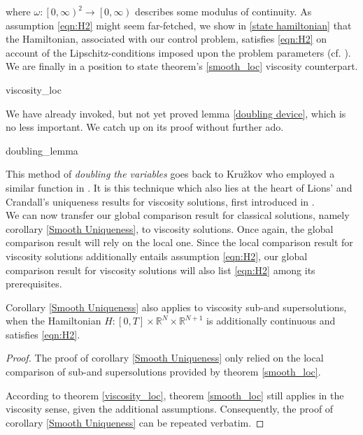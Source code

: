 		 where $ \omega : \left[0, \infty \right)^2 \to \left[0, \infty \right) $ describes some modulus of continuity. As assumption \eqref{eqn:H2} 
		 might seem far-fetched, we show in \ref{state hamiltonian} that the Hamiltonian, associated with our control problem, satisfies \eqref{eqn:H2} on account of the Lipschitz-conditions imposed upon the problem parameters (cf. \cite[p.~167]{zhou}). We are finally in a position to state theorem's \ref{smooth_loc} viscosity counterpart.
		 
		 {viscosity_loc}
		 
		 We have already invoked, but not yet proved lemma \ref{doubling device}, which is no less important. We catch up on its proof without further ado.
		 
		 {doubling_lemma}
		 
		 This method of \emph{doubling the variables} goes back to Kru\v{z}kov who employed a similar function in \cite{kruvzkov}. It is this technique which also lies at the heart of Lions' and Crandall's uniqueness results for viscosity solutions, first introduced in \cite{lions}. \\
		 
		 We can now transfer our global comparison result for classical solutions, namely corollary \ref{Smooth Uniqueness}, to viscosity solutions. Once again, the global comparison result will rely on the local one. Since the local comparison result for viscosity solutions additionally entails assumption  \eqref{eqn:H2}, our global comparison result for viscosity solutions will also list \eqref{eqn:H2} among its prerequisites.
		  
		  \begin{corollary}
		  	\label{Viscosity Uniqueness}
		  	Corollary \ref{Smooth Uniqueness} also applies to viscosity sub-and supersolutions, when the Hamiltonian $ H : \left[ 0, T \right] \times \mathbb{R}^{N} \times \mathbb{R}^{N+1} $ is additionally continuous and satisfies \eqref{eqn:H2}.
		  	
		  	\begin{proof}
		  		The proof of corollary \ref{Smooth Uniqueness} only relied on the local comparison of sub-and supersolutions provided by theorem \ref{smooth_loc}. 
		  		
		  		According to theorem \ref{viscosity_loc}, theorem \ref{smooth_loc} still applies in the viscosity sense, given the additional assumptions. Consequently, the proof of corollary \ref{Smooth Uniqueness} can be repeated verbatim.
		  	\end{proof}
		  \end{corollary}
		  